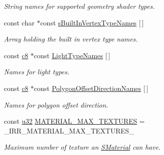 \begin{DoxyCompactItemize}
\begin{DoxyCompactList}\small\item\em String names for supported geometry shader types. \end{DoxyCompactList}\item 
\mbox{\label{namespaceirr_1_1video_a230dd759f8acc5fa67073cff0bb464bc}} 
const char $\ast$const \hyperlink{namespaceirr_1_1video_a230dd759f8acc5fa67073cff0bb464bc}{s\+Built\+In\+Vertex\+Type\+Names} \mbox{[}$\,$\mbox{]}
\begin{DoxyCompactList}\small\item\em Array holding the built in vertex type names. \end{DoxyCompactList}\item 
\mbox{\label{namespaceirr_1_1video_afdadeeab8941ba3198b1ba3db6702601}} 
const \hyperlink{namespaceirr_a9395eaea339bcb546b319e9c96bf7410}{c8} $\ast$const \hyperlink{namespaceirr_1_1video_afdadeeab8941ba3198b1ba3db6702601}{Light\+Type\+Names} \mbox{[}$\,$\mbox{]}
\begin{DoxyCompactList}\small\item\em Names for light types. \end{DoxyCompactList}\item 
\mbox{\label{namespaceirr_1_1video_abc44c32525066fdca0224a33cffc2f39}} 
const \hyperlink{namespaceirr_a9395eaea339bcb546b319e9c96bf7410}{c8} $\ast$const \hyperlink{namespaceirr_1_1video_abc44c32525066fdca0224a33cffc2f39}{Polygon\+Offset\+Direction\+Names} \mbox{[}$\,$\mbox{]}
\begin{DoxyCompactList}\small\item\em Names for polygon offset direction. \end{DoxyCompactList}\item 
\mbox{\label{namespaceirr_1_1video_ad41ca808200ca2e8e9d9326355020052}} 
const \hyperlink{namespaceirr_a0416a53257075833e7002efd0a18e804}{u32} \hyperlink{namespaceirr_1_1video_ad41ca808200ca2e8e9d9326355020052}{M\+A\+T\+E\+R\+I\+A\+L\+\_\+\+M\+A\+X\+\_\+\+T\+E\+X\+T\+U\+R\+ES} = \+\_\+\+I\+R\+R\+\_\+\+M\+A\+T\+E\+R\+I\+A\+L\+\_\+\+M\+A\+X\+\_\+\+T\+E\+X\+T\+U\+R\+E\+S\+\_\+
\begin{DoxyCompactList}\small\item\em Maximum number of texture an \hyperlink{classirr_1_1video_1_1SMaterial}{S\+Material} can have. \end{DoxyCompactList}\item 

\end{DoxyCompactItemize}
